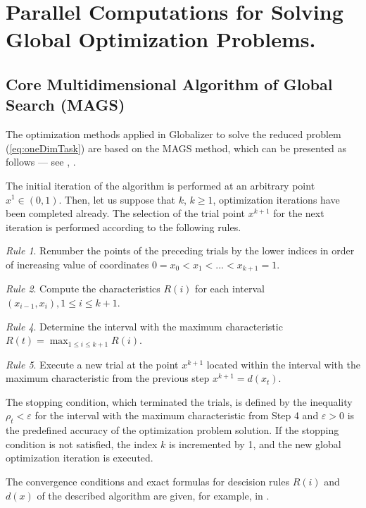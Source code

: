 \documentclass[runningheads]{llncs}
\begin{document}
\section{Parallel Computations for Solving Global Optimization Problems.}
\subsection{Core Multidimensional Algorithm of Global Search (MAGS)}

The optimization methods applied in Globalizer to solve the reduced problem
(\ref{eq:oneDimTask}) are based on the MAGS method, which can be presented as follows ---
see \cite{strongin1978}, \cite{strSergGO}.
\par
The initial iteration of the algorithm is performed at an arbitrary point \mbox{\(x^1\in(0,1)\)}.
Then, let us suppose that \(k\), \(k\ge 1\), optimization iterations have been completed already.
The selection of the trial point \(x^{k+1}\) for the next iteration is performed according to the
following rules.

\textit{Rule 1}. Renumber the points of the preceding trials by the lower indices in order of
increasing value of coordinates
$0=x_0<x_1<...<x_{k+1}=1$.

\textit{Rule 2}. Compute the characteristics \(R(i)\) for each interval \((x_{i-1},x_i),1\leq i\leq
k+1\).

\textit{Rule 4}. Determine the interval with the maximum characteristic $R(t)=\max_{1\leq i
\leq k+1}R(i)$.

\textit{Rule 5}. Execute a new trial at the point \(x^{k+1}\) located within the interval with the
maximum characteristic from the previous step
  $x^{k+1}=d(x_t)$.

The stopping condition, which terminated the trials, is defined by the inequality
$\rho_t<\varepsilon$
for the interval with the maximum characteristic from Step 4 and \(\varepsilon >0\) is the
predefined
accuracy of the optimization problem solution. If the stopping condition is not satisfied,
the index \(k\) is incremented by 1, and the new global optimization iteration is executed.

The convergence conditions and exact formulas for descision rules $R(i)$ and $d(x)$ of the
described algorithm are given, for example, in \cite{strSergGO}.

\end{document}
